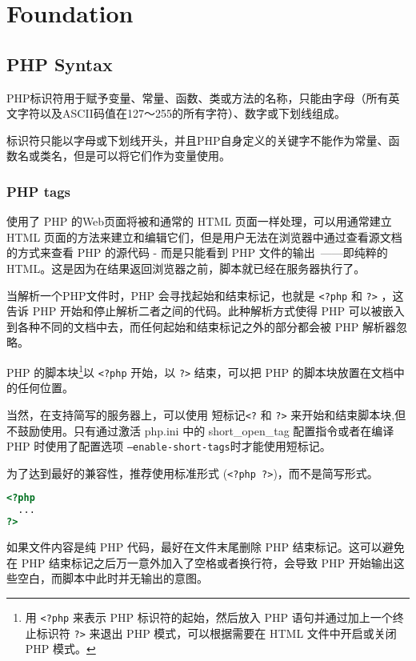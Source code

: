 \part{Foundation}


\chapter{PHP Syntax}


PHP标识符用于赋予变量、常量、函数、类或方法的名称，只能由字母（所有英文字符以及ASCII码值在127～255的所有字符）、数字或下划线组成。

标识符只能以字母或下划线开头，并且PHP自身定义的关键字不能作为常量、函数名或类名，但是可以将它们作为变量使用。



\section{PHP tags}



使用了 PHP 的Web页面将被和通常的 HTML 页面一样处理，可以用通常建立 HTML 页面的方法来建立和编辑它们，但是用户无法在浏览器中通过查看源文档的方式来查看 PHP 的源代码 - 而是只能看到 PHP 文件的输出~——即纯粹的 HTML。这是因为在结果返回浏览器之前，脚本就已经在服务器执行了。

当解析一个PHP文件时，PHP 会寻找起始和结束标记，也就是 \texttt{<?php} 和 \texttt{?>} ，这告诉 PHP 开始和停止解析二者之间的代码。此种解析方式使得 PHP 可以被嵌入到各种不同的文档中去，而任何起始和结束标记之外的部分都会被 PHP 解析器忽略。


PHP 的脚本块\footnote{用 \texttt{<?php} 来表示 PHP 标识符的起始，然后放入 PHP 语句并通过加上一个终止标识符 \texttt{?>} 来退出 PHP 模式，可以根据需要在 HTML 文件中开启或关闭 PHP 模式。}以 \texttt{<?php} 开始，以 \texttt{?>} 结束，可以把 PHP 的脚本块放置在文档中的任何位置。

当然，在支持简写的服务器上，可以使用 短标记\texttt{<?} 和 \texttt{?>} 来开始和结束脚本块,但不鼓励使用。只有通过激活 php.ini 中的 short\_open\_tag 配置指令或者在编译 PHP 时使用了配置选项 \texttt{--enable-short-tags}时才能使用短标记。

为了达到最好的兼容性，推荐使用标准形式 (\texttt{<?php ?>})，而不是简写形式。

\begin{lstlisting}[language=PHP]
<?php
  ...
?>
\end{lstlisting}

如果文件内容是纯 PHP 代码，最好在文件末尾删除 PHP 结束标记。这可以避免在 PHP 结束标记之后万一意外加入了空格或者换行符，会导致 PHP 开始输出这些空白，而脚本中此时并无输出的意图。

